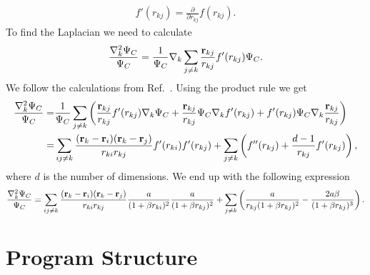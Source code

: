 \documentclass[../main.tex]{subfiles}
\begin{document}
\begin{appendices}
\begin{align}
    f'(r_{kj}) = \frac{\partial}{\partial r_{kj}} f(r_{kj}).
\end{align}
To find the Laplacian we need to calculate
\begin{align}
    \frac{\nabla^2_k \Psi_C}{\Psi_C } = \frac{1}{ \Psi_C }\nabla_k\sum_{j\ne k}\frac{{\bf r}_{kj}}{r_{kj}} f'(r_{kj}) \Psi_C.
\end{align}
We follow the calculations from Ref.~\cite{FYS4411-LectureNotes}. Using the product rule we get
\begin{align}
    \frac{\nabla^2_k \Psi_C}{\Psi_C } = &\frac{1}{ \Psi_C }\sum_{j\ne k}\left(\frac{{\bf r}_{kj}}{r_{kj}} f'(r_{kj}) \nabla_k\Psi_C + \frac{{\bf r}_{kj}}{r_{kj}} \Psi_C \nabla_k f'(r_{kj}) + f'(r_{kj}) \Psi_C \nabla_k\frac{{\bf r}_{kj}}{r_{kj}}\right)\\
    = &\sum_{ij\ne k}\frac{({\bf r}_k-{\bf r}_i)({\bf r}_k-{\bf r}_j)}{r_{ki}r_{kj}}f'(r_{ki})f'(r_{kj})+
    \sum_{j\ne k}\left( f''(r_{kj})+\frac{d-1}{r_{kj}}f'(r_{kj})\right),
\end{align}
where $d$ is the number of dimensions. We end up with the following expression 
\begin{align}
    \frac{\nabla^2_k \Psi_C}{\Psi_C }=
    \sum_{ij\ne k}\frac{({\bf r}_k-{\bf r}_i)({\bf r}_k-{\bf r}_j)}{r_{ki}r_{kj}}\frac{a}{(1+\beta r_{ki})^2}
    \frac{a}{(1+\beta r_{kj})^2}+
    \sum_{j\ne k}\left(\frac{a}{r_{kj}(1+\beta r_{kj})^2}-\frac{2a\beta}{(1+\beta r_{kj})^3}\right).
\end{align}


\chapter{Program Structure}


\end{appendices}
\end{document}
